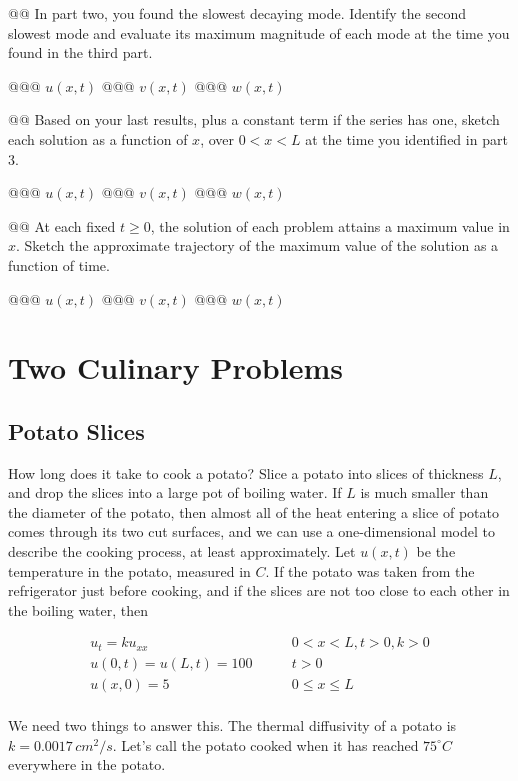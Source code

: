 \documentclass[10pt]{article}
\begin{document}
\begin{easylist}[enumerate]
    @@ In part two, you found the slowest decaying mode. Identify the second slowest mode and evaluate its maximum
    magnitude of each mode at the time you found in the third part.

    @@@ $u(x, t)$
    @@@ $v(x, t)$
    @@@ $w(x, t)$

    @@ Based on your last results, plus a constant term if the series has one, sketch each solution as a function of
    $x$, over $0 < x < L$ at the time you identified in part 3.

    @@@ $u(x, t)$
    @@@ $v(x, t)$
    @@@ $w(x, t)$

    @@ At each fixed $t \ge 0$, the solution of each problem attains a maximum value in $x$. Sketch the approximate
    trajectory of the maximum value of the solution as a function of time.

    @@@ $u(x, t)$
    @@@ $v(x, t)$
    @@@ $w(x, t)$

\end{easylist}

\newpage
\section{Two Culinary Problems}
    \subsection{Potato Slices}

    How long does it take to cook a potato? Slice a potato into slices of thickness $L$, and drop the slices into a
    large pot of boiling water. If $L$ is much smaller than the diameter of the potato, then almost all of the heat
    entering a slice of potato comes through its two cut surfaces, and we can use a one-dimensional model to describe
    the cooking process, at least approximately. Let $u(x, t)$ be the temperature in the potato, measured in $C$. If the
    potato was taken from the refrigerator just before cooking, and if the slices are not too close to each other in the
    boiling water, then

    \begin{align*}
        u_t = ku_{xx} \qquad & 0 < x < L, t > 0, k > 0\\
        u(0, t) = u(L, t) = 100 \qquad & t > 0\\
        u(x, 0) = 5 \qquad & 0 \le x \le L\\
    \end{align*}

    We need two things to answer this. The thermal diffusivity of a potato is $k = 0.0017 \, cm^2/s$. Let's call the
    potato cooked when it has reached $75^\circ C$ everywhere in the potato.
\end{document}
